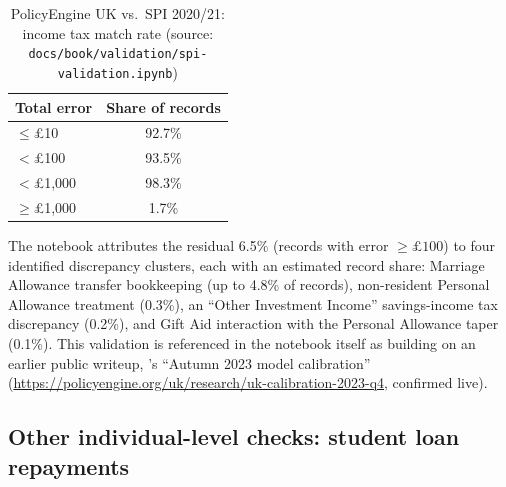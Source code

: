 \begin{table}[H]
    \centering
    \caption{PolicyEngine UK vs.\ SPI 2020/21: income tax match rate
    (source: \texttt{docs/book/validation/spi-validation.ipynb})}
    \label{tab:spi-match}
    \tablefont
    \begin{tabular}{lc}
        \toprule
        Total error & Share of records \\
        \midrule
        $\leq$\pounds{}10 & 92.7\% \\
        $<$\pounds{}100 & 93.5\% \\
        $<$\pounds{}1{,}000 & 98.3\% \\
        $\geq$\pounds{}1{,}000 & 1.7\% \\
        \bottomrule
    \end{tabular}
\end{table}

The notebook attributes the residual 6.5\% (records with error $\geq
\pounds{}100$) to four identified discrepancy clusters, each with an
estimated record share: Marriage Allowance transfer bookkeeping (up to
4.8\% of records), non-resident Personal Allowance treatment (0.3\%), an
``Other Investment Income'' savings-income tax discrepancy (0.2\%), and
Gift Aid interaction with the Personal Allowance taper (0.1\%). This
validation is referenced in the notebook itself as building on an earlier
public writeup, \policyengine{}'s ``Autumn 2023 model calibration''
(\url{https://policyengine.org/uk/research/uk-calibration-2023-q4},
confirmed live). 

\subsection{Other individual-level checks: student loan repayments}
\label{sec:validation-other}

